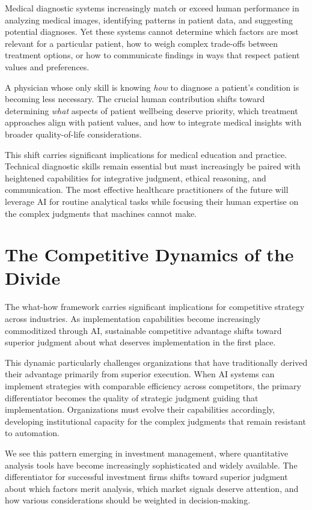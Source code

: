 \documentclass[
  Letterpaper,
]{scrbook}
\begin{document}
Medical diagnostic systems increasingly match or exceed human
performance in analyzing medical images, identifying patterns in patient
data, and suggesting potential diagnoses. Yet these systems cannot
determine which factors are most relevant for a particular patient, how
to weigh complex trade-offs between treatment options, or how to
communicate findings in ways that respect patient values and
preferences.

A physician whose only skill is knowing \emph{how} to diagnose a
patient's condition is becoming less necessary. The crucial human
contribution shifts toward determining \emph{what} aspects of patient
wellbeing deserve priority, which treatment approaches align with
patient values, and how to integrate medical insights with broader
quality-of-life considerations.

This shift carries significant implications for medical education and
practice. Technical diagnostic skills remain essential but must
increasingly be paired with heightened capabilities for integrative
judgment, ethical reasoning, and communication. The most effective
healthcare practitioners of the future will leverage AI for routine
analytical tasks while focusing their human expertise on the complex
judgments that machines cannot make.

\section{The Competitive Dynamics of the
Divide}\label{the-competitive-dynamics-of-the-divide}

The what-how framework carries significant implications for competitive
strategy across industries. As implementation capabilities become
increasingly commoditized through AI, sustainable competitive advantage
shifts toward superior judgment about what deserves implementation in
the first place.

This dynamic particularly challenges organizations that have
traditionally derived their advantage primarily from superior execution.
When AI systems can implement strategies with comparable efficiency
across competitors, the primary differentiator becomes the quality of
strategic judgment guiding that implementation. Organizations must
evolve their capabilities accordingly, developing institutional capacity
for the complex judgments that remain resistant to automation.

We see this pattern emerging in investment management, where
quantitative analysis tools have become increasingly sophisticated and
widely available. The differentiator for successful investment firms
shifts toward superior judgment about which factors merit analysis,
which market signals deserve attention, and how various considerations
should be weighted in decision-making.
\end{document}

